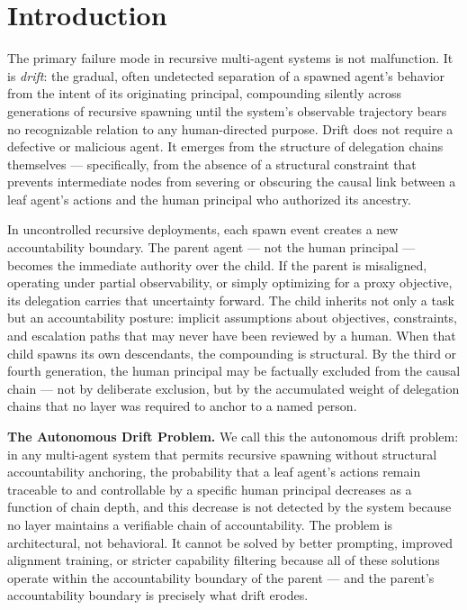 \section{Introduction}\label{sec:introduction}

The primary failure mode in recursive multi-agent systems is not malfunction. It is \emph{drift}: the gradual, often undetected separation of a spawned agent's behavior from the intent of its originating principal, compounding silently across generations of recursive spawning until the system's observable trajectory bears no recognizable relation to any human-directed purpose. Drift does not require a defective or malicious agent. It emerges from the structure of delegation chains themselves — specifically, from the absence of a structural constraint that prevents intermediate nodes from severing or obscuring the causal link between a leaf agent's actions and the human principal who authorized its ancestry.

In uncontrolled recursive deployments, each spawn event creates a new accountability boundary. The parent agent — not the human principal — becomes the immediate authority over the child. If the parent is misaligned, operating under partial observability, or simply optimizing for a proxy objective, its delegation carries that uncertainty forward. The child inherits not only a task but an accountability posture: implicit assumptions about objectives, constraints, and escalation paths that may never have been reviewed by a human. When that child spawns its own descendants, the compounding is structural. By the third or fourth generation, the human principal may be factually excluded from the causal chain — not by deliberate exclusion, but by the accumulated weight of delegation chains that no layer was required to anchor to a named person.

\textbf{The Autonomous Drift Problem.} We call this the autonomous drift problem: in any multi-agent system that permits recursive spawning without structural accountability anchoring, the probability that a leaf agent's actions remain traceable to and controllable by a specific human principal decreases as a function of chain depth, and this decrease is not detected by the system because no layer maintains a verifiable chain of accountability. The problem is architectural, not behavioral. It cannot be solved by better prompting, improved alignment training, or stricter capability filtering because all of these solutions operate within the accountability boundary of the parent — and the parent's accountability boundary is precisely what drift erodes.

